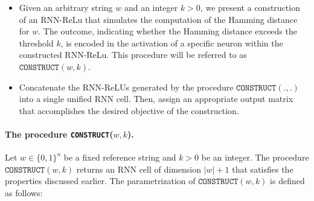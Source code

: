      
     \begin{itemize}
         \item Given an arbitrary string $w$ and an integer $k > 0$, we present a construction of an RNN-ReLu that simulates the computation of the Hamming distance for $w$. The outcome, indicating whether the Hamming distance exceeds the threshold $k$, is encoded in the activation of a specific neuron within the constructed RNN-ReLu. This procedure will be referred to as $\texttt{CONSTRUCT}(w,k)$.
         \item Concatenate the RNN-ReLUs generated by the procedure $\texttt{CONSTRUCT}(.,.)$ into a single unified RNN cell. Then, assign an appropriate output matrix that accomplishes the desired objective of the construction.
     \end{itemize}
     
     \paragraph{The procedure \texttt{CONSTRUCT}($w,k$).}  Let $w \in \{0,1\}^{n}$ be a fixed reference string and $k > 0$ be an integer. The procedure $\texttt{CONSTRUCT}(w,k)$ returns an RNN cell of dimension $|w| + 1$ that satisfies the properties discussed earlier. The parametrization of $\texttt{CONSTRUCT}(w,k)$ is defined as follows:









